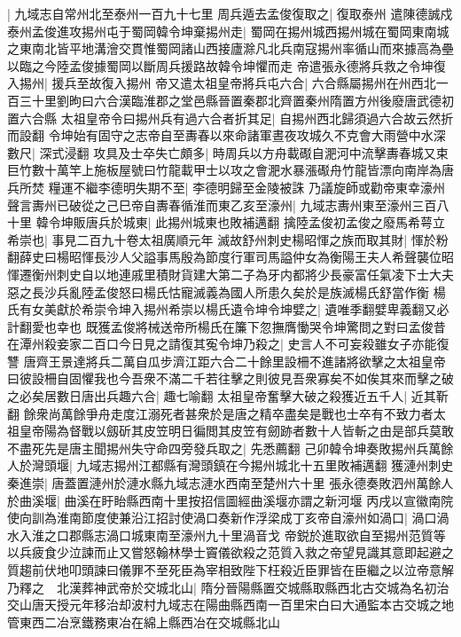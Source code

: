 |{
	九域志自常州北至泰州一百九十七里}
周兵遁去孟俊復取之|{
	復取泰州}
遣陳德誠戍泰州孟俊進攻掦州屯于蜀岡韓令坤棄掦州走|{
	蜀岡在掦州城西掦州城在蜀岡東南城之東南北皆平地溝澮交貫惟蜀岡諸山西接廬滁凡北兵南寇掦州率循山而來據高為壘以臨之今陸孟俊據蜀岡以斷周兵援路故韓令坤懼而走}
帝遣張永德將兵救之令坤復入掦州|{
	援兵至故復入掦州}
帝又遣太祖皇帝將兵屯六合|{
	六合縣屬掦州在州西北一百三十里劉昫曰六合漢臨淮郡之堂邑縣晉置秦郡北齊置秦州隋置方州後廢唐武德初置六合縣}
太祖皇帝令曰掦州兵有過六合者折其足|{
	自掦州西北歸須過六合故云然折而設翻}
令坤始有固守之志帝自至夀春以來命諸軍晝夜攻城久不克會大雨營中水深數尺|{
	深式浸翻}
攻具及士卒失亡頗多|{
	時周兵以方舟載礟自淝河中流擊夀春城又束巨竹數十萬竿上施板屋號曰竹龍載甲士以攻之會淝水暴漲礟舟竹龍皆漂向南岸為唐兵所焚}
糧運不繼李德明失期不至|{
	李德明歸至金陵被誅}
乃議旋師或勸帝東幸濠州聲言夀州已破從之己巳帝自夀春循淮而東乙亥至濠州|{
	九域志夀州東至濠州三百八十里}
韓令坤販唐兵於城東|{
	此掦州城東也敗補邁翻}
擒陸孟俊初孟俊之廢馬希萼立希崇也|{
	事見二百九十卷太祖廣順元年}
滅故舒州刺史楊昭惲之族而取其財|{
	惲於粉翻薛史曰楊昭惲長沙人父謚事馬殷為節度行軍司馬謚仲女為衡陽王夫人希聲襲位昭惲遷衡州刺史自以地連戚里積財貨建大第二子為牙内都將少長豪富任氣凌下士大夫惡之長沙兵亂陸孟俊怒曰楊氏怙寵滅義為國人所患久矣於是族滅楊氏舒當作衡}
楊氏有女美獻於希崇令坤入掦州希崇以楊氏遺令坤令坤嬖之|{
	遺唯季翻嬖卑義翻又必計翻愛也幸也}
既獲孟俊將械送帝所楊氏在簾下忽撫膺慟哭令坤驚問之對曰孟俊昔在潭州殺妾家二百口今日見之請復其寃令坤乃殺之|{
	史言人不可妄殺雖女子亦能復讐}
唐齊王景達將兵二萬自瓜步濟江距六合二十餘里設柵不進諸將欲擊之太祖皇帝曰彼設柵自固懼我也今吾衆不滿二千若往擊之則彼見吾衆寡矣不如俟其來而擊之破之必矣居數日唐出兵趣六合|{
	趣七喻翻}
太祖皇帝奮擊大破之殺獲近五千人|{
	近其靳翻}
餘衆尚萬餘爭舟走度江溺死者甚衆於是唐之精卒盡矣是戰也士卒有不致力者太祖皇帝陽為督戰以劔斫其皮笠明日徧閲其皮笠有劒跡者數十人皆斬之由是部兵莫敢不盡死先是唐主聞掦州失守命四旁發兵取之|{
	先悉薦翻}
己卯韓令坤奏敗掦州兵萬餘人於灣頭堰|{
	九域志掦州江都縣有灣頭鎮在今掦州城北十五里敗補邁翻}
獲漣州刺史秦進崇|{
	唐蓋置漣州於漣水縣九域志漣水西南至楚州六十里}
張永德奏敗泗州萬餘人於曲溪堰|{
	曲溪在盱眙縣西南十里按招信圖經曲溪堰亦謂之新河堰}
丙戌以宣徽南院使向訓為淮南節度使兼沿江招討使渦口奏新作浮梁成丁亥帝自濠州如渦口|{
	渦口渦水入淮之口郡縣志渦口城東南至濠州九十里渦音戈}
帝鋭於進取欲自至掦州范質等以兵疲食少泣諫而止又嘗怒翰林學士竇儀欲殺之范質入救之帝望見識其意即起避之質趨前伏地叩頭諫曰儀罪不至死臣為宰相致陛下枉殺近臣罪皆在臣繼之以泣帝意解乃釋之　北漢葬神武帝於交城北山|{
	隋分晉陽縣置交城縣取縣西北古交城為名初治交山唐天授元年移治却波村九域志在陽曲縣西南一百里宋白曰大通監本古交城之地管東西二冶烹鐵務東冶在綿上縣西冶在交城縣北山}
